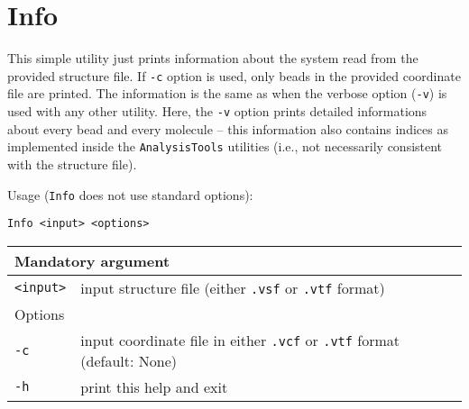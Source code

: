 \section{Info} \label{sec:Info}

This simple utility just prints information about the system read from the
provided structure file. If \texttt{-c} option is used, only beads in the
provided coordinate file are printed. The information is the same as when
the verbose option (\texttt{-v}) is used with any other utility. Here, the
\texttt{-v} option prints detailed informations about every bead and every
molecule -- this information also contains indices as implemented inside
the \texttt{AnalysisTools} utilities (i.e., not necessarily consistent with
the structure file).

Usage (\texttt{Info} does not use standard options):

\vspace{1em}
\noindent
\texttt{Info <input> <options>}

\vspace{1em}
\noindent
\begin{longtable}{p{}p{}}
  \toprule
  \multicolumn{2}{l}{Mandatory argument} \\
  \midrule
  \texttt{<input>} & input structure file (either \texttt{.vsf} or
    \texttt{.vtf} format) \\
  \multicolumn{2}{l}{Options} \\
  \texttt{-c} & input coordinate file in either \texttt{.vcf} or
    \texttt{.vtf} format (default: None) \\
  \texttt{-h} & print this help and exit \\
  \bottomrule
\end{longtable}
